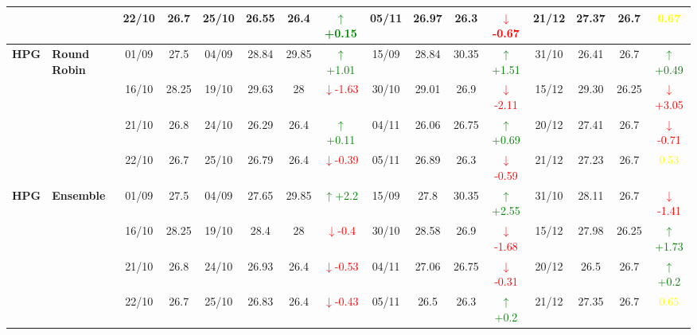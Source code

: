 \documentclass{ieeeaccess}
\begin{document}
{\begin{longtable}{llcc|cccc|cccc|cccc}
&
& 22/10 & 26.7 & 25/10 & 26.55 & 26.4 & \textcolor{green}{\(\uparrow\)+0.15} & 05/11 & 26.97 & 26.3 & \textcolor{red}{\(\downarrow\)-0.67} & 21/12 & 27.37 & 26.7 & \textcolor{yellow}{0.67} \\
\midrule


\multirow{4}{*}{\textbf{HPG}} 
& \textbf{Round Robin}
& 01/09 & 27.5 & 04/09 & 28.84 & 29.85 & \textcolor{green}{\(\uparrow\)+1.01} & 15/09 & 28.84 & 30.35 & \textcolor{green}{\(\uparrow\)+1.51} & 31/10 & 26.41 & 26.7 & \textcolor{green}{\(\uparrow\)+0.49} \\

& 
& 16/10 & 28.25 & 19/10 & 29.63 & 28 & \textcolor{red}{\(\downarrow\)-1.63} & 30/10 & 29.01 & 26.9 & \textcolor{red}{\(\downarrow\)-2.11} & 15/12 & 29.30 & 26.25 & \textcolor{red}{\(\downarrow\)+3.05} \\

& 
& 21/10 & 26.8 & 24/10 & 26.29 & 26.4 & \textcolor{green}{\(\uparrow\)+0.11} & 04/11 & 26.06 & 26.75 & \textcolor{green}{\(\uparrow\)+0.69} & 20/12 & 27.41 & 26.7 & \textcolor{red}{\(\downarrow\)-0.71} \\

&
& 22/10 & 26.7 & 25/10 & 26.79 & 26.4 & \textcolor{red}{\(\downarrow\)-0.39} & 05/11 & 26.89 & 26.3 & \textcolor{red}{\(\downarrow\)-0.59} & 21/12 & 27.23 & 26.7 & \textcolor{yellow}{0.53} \\
\midrule


\multirow{4}{*}{\textbf{HPG}} 
& \textbf{Ensemble}
& 01/09 & 27.5 & 04/09 & 27.65 & 29.85& \textcolor{green}{\(\uparrow\)+2.2} & 15/09 & 27.8 & 30.35 & \textcolor{green}{\(\uparrow\)+2.55} & 31/10 & 28.11 & 26.7 & \textcolor{red}{\(\downarrow\)-1.41} \\

& 
& 16/10 & 28.25 & 19/10 & 28.4 & 28 & \textcolor{red}{\(\downarrow\)-0.4} & 30/10 & 28.58 & 26.9 & \textcolor{red}{\(\downarrow\)-1.68} & 15/12 & 27.98 & 26.25 & \textcolor{green}{\(\uparrow\)+1.73} \\

& 
& 21/10 & 26.8 & 24/10 & 26.93 & 26.4 & \textcolor{red}{\(\downarrow\)-0.53} & 04/11 & 27.06 & 26.75 & \textcolor{red}{\(\downarrow\)-0.31} & 20/12 & 26.5 & 26.7 & \textcolor{green}{\(\uparrow\)+0.2} \\

&
& 22/10 & 26.7 & 25/10 & 26.83 & 26.4 & \textcolor{red}{\(\downarrow\)-0.43} & 05/11 & 26.5 & 26.3 & \textcolor{green}{\(\uparrow\)+0.2} & 21/12 & 27.35 & 26.7 & \textcolor{yellow}{0.65} \\
\midrule




\end{longtable}}
\end{document}
